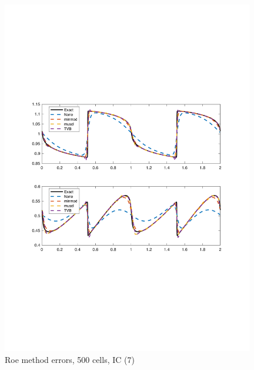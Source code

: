 \documentclass[11pt,a4paper]{article}
\begin{document}
\begin{figure}[!htb]
    \centering
    \includegraphics[width=11cm]{2_2_a_IC_3_Roe.pdf}
    \caption{Roe method errors, 500 cells, IC (7)}
    \label{fig:Roe_IC_3}
\end{figure}
\end{document}
